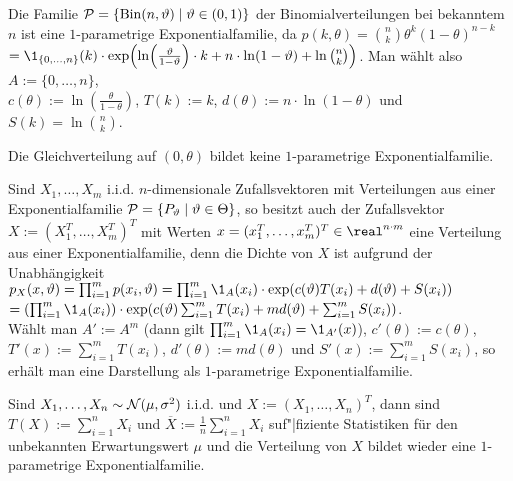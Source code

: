 \begin{Bsp}
    Die Familie $\P = \{\Bin(n, \theta) \;|\; \theta \in (0, 1)\}$ der Binomialverteilungen
    bei bekanntem $n$ ist eine $1$-parametrige Exponentialfamilie, da
    $p(k, \theta) = \binom{n}{k} \theta^k (1-\theta)^{n-k}$\\
    $= \1_{\{0,\dotsc,n\}}(k) \cdot
    \exp\!\left(\ln\!\left(\frac{\theta}{1 - \theta}\right) \cdot k +
    n \cdot \ln(1 - \theta) + \ln \binom{n}{k}\right)$.
    Man wählt also $A := \{0, \dotsc, n\}$,\\
    $c(\theta) := \ln\!\left(\frac{\theta}{1 - \theta}\right)$,
    $T(k) := k$, $d(\theta) := n \cdot \ln(1 - \theta)$ und
    $S(k) = \ln \binom{n}{k}$.
\end{Bsp}

\begin{Bsp}
    Die Gleichverteilung auf $(0, \theta)$ bildet keine $1$-parametrige Exponentialfamilie.
\end{Bsp}

\linie

\begin{Bem}
    Sind $X_1, \dotsc, X_m$ i.i.d. $n$-dimensionale Zufallsvektoren mit Verteilungen aus einer
    Exponentialfamilie $\P = \{P_\theta \;|\; \theta \in \Theta\}$,
    so besitzt auch der Zufallsvektor $X := (X_1^T, \dotsc, X_m^T)^T$ mit Werten
    $x = (x_1^T, \dotsc, x_m^T)^T \in \real^{n \cdot m}$ eine Verteilung aus einer
    Exponentialfamilie, denn die Dichte von $X$ ist aufgrund der Unabhängigkeit\\
    $p_X(x, \theta) = \prod_{i=1}^m p(x_i, \theta) =
    \prod_{i=1}^m \1_A(x_i) \cdot \exp\!\left(c(\theta) T(x_i) + d(\theta) + S(x_i)\right)$\\
    $= \left(\prod_{i=1}^m \1_A(x_i)\right) \cdot
    \exp\!\left(c(\theta) \sum_{i=1}^m T(x_i) + m d(\theta) + \sum_{i=1}^m S(x_i)\right)$.\\
    Wählt man $A' := A^m$ (dann gilt $\prod_{i=1}^m \1_A(x_i) = \1_{A'}(x)$),
    $c'(\theta) := c(\theta)$, $T'(x) := \sum_{i=1}^m T(x_i)$,
    $d'(\theta) := m d(\theta)$ und
    $S'(x) := \sum_{i=1}^m S(x_i)$, so erhält man eine Darstellung als $1$-parametrige
    Exponentialfamilie.
\end{Bem}

\begin{Bsp}
    Sind $X_1, \dotsc, X_n \sim \N(\mu, \sigma^2)$ i.i.d. und
    $X := (X_1, \dotsc, X_n)^T$, dann sind $T(X) := \sum_{i=1}^n X_i$ und
    $\overline{X} := \frac{1}{n} \sum_{i=1}^n X_i$ suf"|fiziente Statistiken für den unbekannten
    Erwartungswert $\mu$ und die Verteilung von $X$ bildet wieder eine $1$-parametrige
    Exponentialfamilie.
\end{Bsp}

